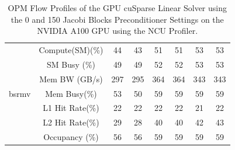 \begin{table}[!h]
\begin{tabular}{c|c|c|c|c|c|c|c}
\multirow{7}{*}{bsrmv} & Compute(SM)(\%) & 44 & 43 & 51 & 51 & 53 & 53\\
 & SM Busy (\%) & 49 & 49 & 52 & 52 & 53 & 53\\
 & Mem BW (GB/s) & 297 & 295 & 364 & 364 & 343 & 343\\
 & Mem Busy(\%) & 53 & 50 & 59 & 59 & 59 & 59\\
 & L1 Hit Rate(\%) & 22 & 22 & 22 & 22 & 21 & 22 \\
 & L2 Hit Rate(\%) & 29 & 28 & 40 & 40 & 42 & 43\\
 & Occupancy (\%) & 56 & 56 & 59 & 59 & 59 & 59\\\hline
\end{tabular}
\caption{OPM Flow Profiles of the GPU cuSparse Linear Solver using the 0 and 150 Jacobi Blocks Preconditioner Settings on the NVIDIA A100 GPU using the NCU Profiler.}
\label{tab:ncu_profiler}
\end{table}

